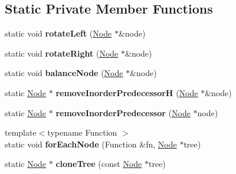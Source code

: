 \subsection*{Static Private Member Functions}
\begin{DoxyCompactItemize}
\item 
\hypertarget{classbalanced__tree_a9cefccbc071201d2b85588229443a787}{static void {\bfseries rotate\+Left} (\hyperlink{structbalanced__tree_1_1Node}{Node} $\ast$\&node)}\label{classbalanced__tree_a9cefccbc071201d2b85588229443a787}

\item 
\hypertarget{classbalanced__tree_ad01cdf09375397d7bd372b38bfc3b645}{static void {\bfseries rotate\+Right} (\hyperlink{structbalanced__tree_1_1Node}{Node} $\ast$\&node)}\label{classbalanced__tree_ad01cdf09375397d7bd372b38bfc3b645}

\item 
\hypertarget{classbalanced__tree_a1182720cf6e16367c74d6ccf90e8b305}{static void {\bfseries balance\+Node} (\hyperlink{structbalanced__tree_1_1Node}{Node} $\ast$\&node)}\label{classbalanced__tree_a1182720cf6e16367c74d6ccf90e8b305}

\item 
\hypertarget{classbalanced__tree_a616743ad4fc82c4359bbdda47415cf84}{static \hyperlink{structbalanced__tree_1_1Node}{Node} $\ast$ {\bfseries remove\+Inorder\+Predecessor\+H} (\hyperlink{structbalanced__tree_1_1Node}{Node} $\ast$\&node)}\label{classbalanced__tree_a616743ad4fc82c4359bbdda47415cf84}

\item 
\hypertarget{classbalanced__tree_a6f29297ffca1b00a5679f6e0abd46980}{static \hyperlink{structbalanced__tree_1_1Node}{Node} $\ast$ {\bfseries remove\+Inorder\+Predecessor} (\hyperlink{structbalanced__tree_1_1Node}{Node} $\ast$node)}\label{classbalanced__tree_a6f29297ffca1b00a5679f6e0abd46980}

\item 
\hypertarget{classbalanced__tree_a4b506e388ddd19be24e6eb0f33e937aa}{{\footnotesize template$<$typename Function $>$ }\\static void {\bfseries for\+Each\+Node} (Function \&fn, \hyperlink{structbalanced__tree_1_1Node}{Node} $\ast$tree)}\label{classbalanced__tree_a4b506e388ddd19be24e6eb0f33e937aa}

\item 
\hypertarget{classbalanced__tree_aa2f4716a881972bad86b4b7d88fd5eed}{static \hyperlink{structbalanced__tree_1_1Node}{Node} $\ast$ {\bfseries clone\+Tree} (const \hyperlink{structbalanced__tree_1_1Node}{Node} $\ast$tree)}\label{classbalanced__tree_aa2f4716a881972bad86b4b7d88fd5eed}


\end{DoxyCompactItemize}

